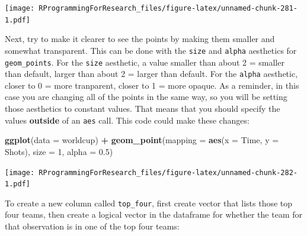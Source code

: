 \documentclass[]{book}
\makeatletter
\newenvironment{Shaded}{\begin{snugshade}}{\end{snugshade}}
\newcommand{\KeywordTok}[1]{\textcolor[rgb]{0.13,0.29,0.53}{\textbf{#1}}}
\newcommand{\DataTypeTok}[1]{\textcolor[rgb]{0.13,0.29,0.53}{#1}}
\newcommand{\DecValTok}[1]{\textcolor[rgb]{0.00,0.00,0.81}{#1}}
\newcommand{\FloatTok}[1]{\textcolor[rgb]{0.00,0.00,0.81}{#1}}
\newcommand{\StringTok}[1]{\textcolor[rgb]{0.31,0.60,0.02}{#1}}
\newcommand{\OperatorTok}[1]{\textcolor[rgb]{0.81,0.36,0.00}{\textbf{#1}}}
\newcommand{\NormalTok}[1]{#1}
\newenvironment{kframe}{%
\medskip{}
\setlength{\fboxsep}{.8em}
 \def\at@end@of@kframe{}%
 \ifinner\ifhmode%
  \def\at@end@of@kframe{\end{minipage}}%
  \begin{minipage}{\columnwidth}%
 \fi\fi%
 \def\FrameCommand##1{\hskip\@totalleftmargin \hskip-\fboxsep
 \colorbox{shadecolor}{##1}\hskip-\fboxsep
     \hskip-\linewidth \hskip-\@totalleftmargin \hskip\columnwidth}%
 \MakeFramed {\advance\hsize-\width
   \@totalleftmargin\z@ \linewidth\hsize
   \@setminipage}}%
 {\par\unskip\endMakeFramed%
 \at@end@of@kframe}
\renewenvironment{Shaded}{\begin{kframe}}{\end{kframe}}
\theoremstyle{definition}
\theoremstyle{definition}
\theoremstyle{definition}
\theoremstyle{remark}
\makeatother
\begin{document}
\texttt{[image: RProgrammingForResearch\_files/figure-latex/unnamed-chunk-281-1.pdf]}

Next, try to make it clearer to see the points by making them smaller
and somewhat transparent. This can be done with the \texttt{size} and
\texttt{alpha} aesthetics for \texttt{geom\_points}. For the
\texttt{size} aesthetic, a value smaller than about 2 = smaller than
default, larger than about 2 = larger than default. For the
\texttt{alpha} aesthetic, closer to 0 = more tranparent, closer to 1 =
more opaque. As a reminder, in this case you are changing all of the
points in the same way, so you will be setting those aesthetics to
constant values. That means that you should specify the values
\textbf{outside} of an \texttt{aes} call. This code could make these
changes:

\begin{Shaded}
\begin{Highlighting}[]
\KeywordTok{ggplot}\NormalTok{(}\DataTypeTok{data =}\NormalTok{ worldcup) }\OperatorTok{+}
\StringTok{        }\KeywordTok{geom_point}\NormalTok{(}\DataTypeTok{mapping =} \KeywordTok{aes}\NormalTok{(}\DataTypeTok{x =}\NormalTok{ Time, }\DataTypeTok{y =}\NormalTok{ Shots),}
                   \DataTypeTok{size =} \DecValTok{1}\NormalTok{, }\DataTypeTok{alpha =} \FloatTok{0.5}\NormalTok{)}
\end{Highlighting}
\end{Shaded}

\texttt{[image: RProgrammingForResearch\_files/figure-latex/unnamed-chunk-282-1.pdf]}

To create a new column called \texttt{top\_four}, first create vector
that lists those top four teams, then create a logical vector in the
dataframe for whether the team for that observation is in one of the top
four teams:

\begin{Shaded}
\end{Shaded}
\end{document}

